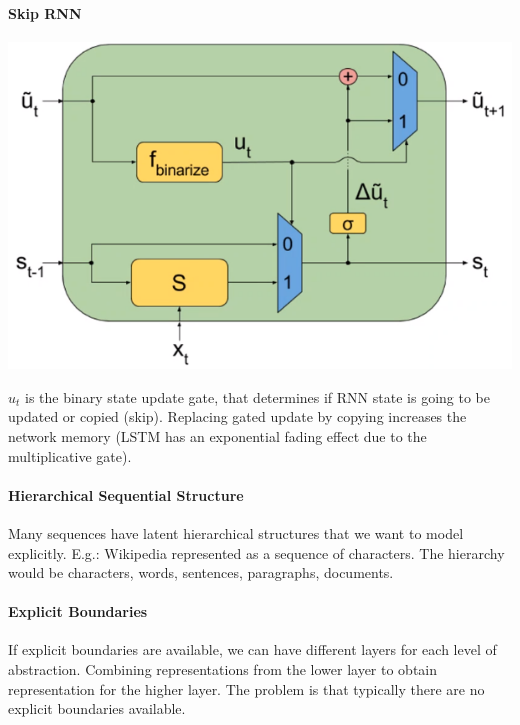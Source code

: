 \documentclass[10pt]{report}
\begin{document}
\paragraph{Skip RNN}
\begin{center}
	\includegraphics[scale=0.5]{125.png}
\end{center}
$u_t$ is the binary state update gate, that determines if RNN state is going to be updated or copied (skip). Replacing gated update by copying increases the network memory (LSTM has an exponential fading effect due to the multiplicative gate).
\paragraph{Hierarchical Sequential Structure}
Many sequences have latent hierarchical structures that we want to model explicitly. E.g.: Wikipedia represented as a sequence of characters. The hierarchy would be characters, words, sentences, paragraphs, documents.
\paragraph{Explicit Boundaries} If explicit boundaries are available, we can have different layers for each level of abstraction. Combining representations from the lower layer to obtain representation for the higher layer. The problem is that typically there are no explicit boundaries available.
\end{document}
